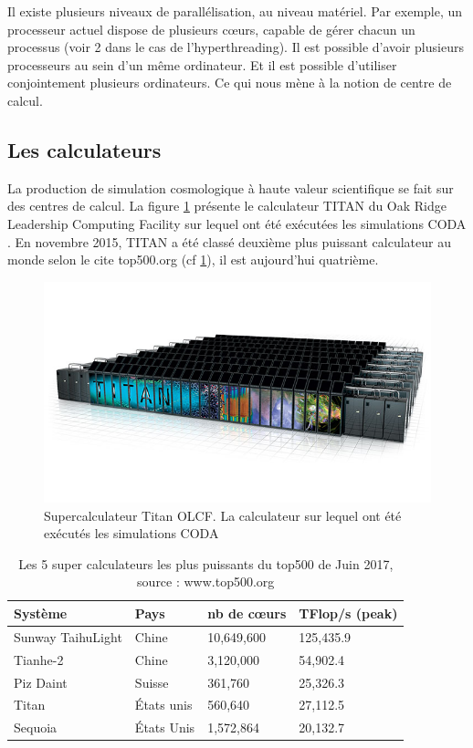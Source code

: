 Il existe plusieurs niveaux de parallélisation, au niveau matériel.
Par exemple, un processeur actuel dispose de plusieurs cœurs, capable de gérer chacun un processus (voir 2 dans le cas de l'hyperthreading).
Il est possible d'avoir plusieurs processeurs au sein d'un même ordinateur.
Et il est possible d'utiliser conjointement plusieurs ordinateurs.
Ce qui nous mène à la notion de centre de calcul.

\subsection{Les calculateurs}
\label{sec:titan}
La production de simulation cosmologique à haute valeur scientifique se fait sur des centres de calcul.
La figure \ref{fig:titan} présente le calculateur TITAN du Oak Ridge Leadership Computing Facility sur lequel ont été exécutées les simulations CODA \citep{ocvirk_cosmic_2015}.
En novembre 2015, TITAN a été classé deuxième plus puissant calculateur au monde selon le cite top500.org (cf \ref{tab:top500}), il est aujourd'hui quatrième.

\begin{figure}[bth]
        \includegraphics[width=.95\linewidth]{img/02/titan.jpg} 
        \caption[Titan]{Supercalculateur Titan OLCF.
        La calculateur sur lequel ont été exécutés les simulations CODA}
 		\label{fig:titan}
\end{figure}

\begin{table}[bth]
\begin{tabular}{ l l l l }
\hline 
Système & Pays & nb de cœurs & TFlop/s (peak) \\
\hline 
Sunway TaihuLight & Chine & 10,649,600 & 125,435.9 \\ 
Tianhe-2  & Chine & 3,120,000 & 54,902.4 \\ 
Piz Daint  & Suisse & 361,760 & 25,326.3 \\ 
Titan  & États unis & 560,640 & 27,112.5 \\ 
Sequoia  & États Unis &1,572,864 & 20,132.7 \\ 
\end{tabular} 
\caption[TOP500]{Les 5 super calculateurs les plus puissants du top500 de Juin 2017, source : www.top500.org}
\label{tab:top500}
\end{table}

